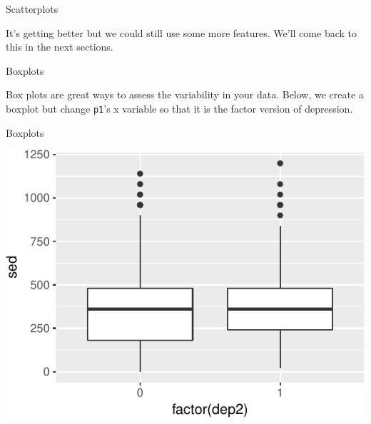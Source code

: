 \begin{frame}{Scatterplots}

It's getting better but we could still use some more features. We'll
come back to this in the next sections.

\end{frame}

\begin{frame}[fragile]{Boxplots}

Box plots are great ways to assess the variability in your data. Below,
we create a boxplot but change \texttt{p1}'s x variable so that it is
the factor version of depression.

\begin{Shaded}
\begin{Highlighting}[]
\NormalTok{(} \OperatorTok{+}
\StringTok{  }\NormalTok{()}
\end{Highlighting}
\end{Shaded}

\end{frame}

\begin{frame}{Boxplots}

\includegraphics{09_AdvancedPlotting_files/figure-beamer/c4-1.pdf}

\end{frame}

